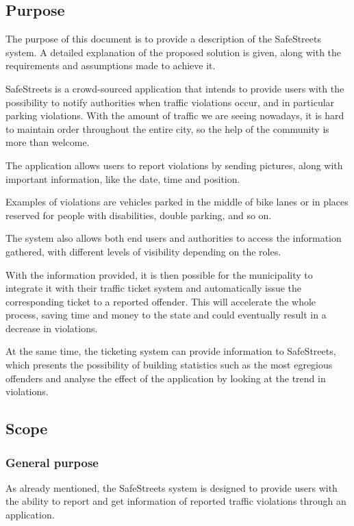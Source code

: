 \subsection{Purpose}

The purpose of this document is to provide a description of the SafeStreets system. A detailed explanation of the proposed solution is given, along with the requirements and assumptions made to achieve it.

SafeStreets is a crowd-sourced application that	 intends to provide users with the possibility to notify authorities when traffic violations occur, and in particular	 parking violations. With the amount of traffic we are seeing nowadays, it is hard to maintain order throughout the entire city, so the help of the community is more than welcome.

The application allows users to report violations by sending pictures, along with important information, like the date, time and position.

Examples of violations are vehicles parked in the middle of bike lanes or in places reserved for people with disabilities, double parking, and so on.

The system also allows both end users and authorities to access the information gathered, with different levels of visibility depending on the roles.

With the information provided, it is then possible for the municipality to integrate it with their traffic ticket system and automatically issue the corresponding ticket to a reported offender. This will accelerate the whole process, saving time and money to the state and could eventually result in a decrease in violations.

At the same time, the ticketing system can provide information to SafeStreets, which presents the possibility of building statistics such as the most egregious offenders and analyse the effect of the application by looking at the trend in violations.

\subsection{Scope}

\subsubsection{General purpose}

As already mentioned, the SafeStreets system is designed to provide users with the ability to report and get information of reported traffic violations through an application. 

